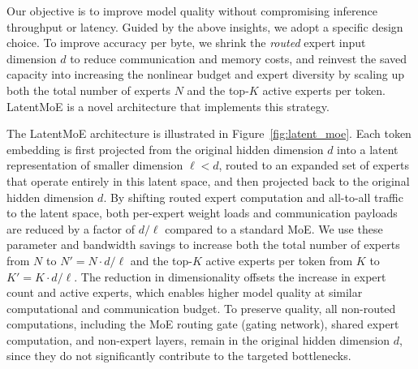 Our objective is to improve model quality without compromising inference throughput or latency.
Guided by the above insights, we adopt a specific design choice. To improve accuracy per byte, we shrink the \emph{routed} expert input dimension $d$ to reduce communication and memory costs, and reinvest
the saved capacity into increasing the nonlinear budget and expert diversity by scaling up both the
total number of experts $N$ and the top-$K$ active experts per token. LatentMoE is a novel architecture that implements this strategy.

The LatentMoE architecture is illustrated in Figure~\ref{fig:latent_moe}. Each token embedding is first projected from the original hidden dimension $d$ into a latent representation of smaller dimension $\ell < d$, routed to an expanded set of experts that operate entirely in this latent space, and then projected back to the original hidden dimension $d$.
By shifting routed expert computation and all-to-all traffic to the latent space, both per-expert weight loads and communication payloads are reduced by a factor of $d / \ell$ compared to a standard MoE. 
We use these parameter and bandwidth savings to increase both the total number of experts from $N$ to $N' = N \cdot d / \ell$ and the top-$K$ active experts per token from
$K$ to $K' = K \cdot d / \ell$. The reduction in dimensionality offsets the increase in expert count and active experts, which enables higher model quality at similar computational and communication budget.
To preserve quality, all non-routed computations, including the MoE routing gate (gating network), shared expert computation, and non-expert layers, remain in the original hidden dimension $d$, since they do not significantly contribute to the targeted bottlenecks.


